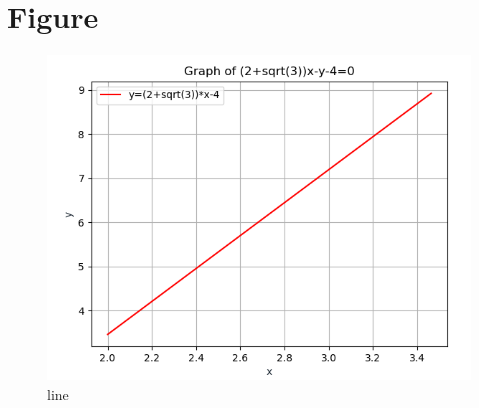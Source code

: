 \documentclass[12pt]{article}
\begin{document}
\section{Figure}
\begin{figure}[h]
\includegraphics[width=\columnwidth]{./figs/line.png}
\caption{line}
		\label{fig:Figure}
\end{figure}
\end{document}
